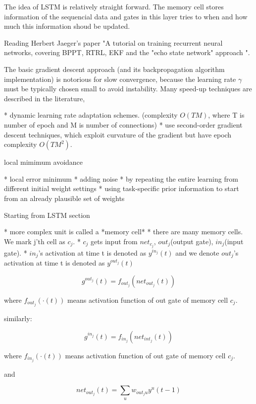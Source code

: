 \documentclass[officiallayout]{tktla}
\begin{document}
The idea of LSTM is relatively straight forward. The memory cell stores information of the sequencial data and gates in this layer tries to when and how much this information shoud be updated.

Reading Herbert Jaeger's paper "A tutorial on training recurrent neural networks, covering BPPT, RTRL, EKF and the "echo state network" approach ".

The basic gradient descent approach (and its backpropagation algorithm implementation) is notorious for slow convergence, because the learning rate $\gamma$ must be typically chosen small to avoid instability. Many speed-up techniques are described in the literature, 

* dynamic learning rate adaptation schemes. (complexity $O(TM)$, where T is number of epoch and M is number of connections)
* use second-order gradient descent techniques, which exploit curvature of the gradient but have epoch complexity $O(TM^2)$. 

local mimimum avoidance

* local error minimum
* adding noise
* by repeating the entire learning from different initial weight settings
* using task-specific prior information to start from an already plausible set of weights

Starting from LSTM section

* more complex unit is called a *memory cell*
* there are many memory cells. We mark j'th cell as $c_j$.
* $c_j$ gets input from $net_{c_j}$, $out_j$(output gate), $in_j$(input gate).
* $in_j$'s activation at time t is denoted as $y^{in_j}(t)$ and we denote $out_j$'s activation at time t is denoted as $y^{out_j}(t)$

\begin{equation}
g^{out_j}(t) = f_{out_j}(net_{out_j}(t))
\end{equation}


where $f_{out_j}(\cdot (t))$ means activation function of out gate of memory cell $c_j$.

similarly:


\begin{equation}
g^{in_j}(t) = f_{in_j}(net_{int_j}(t))
\end{equation}


where $f_{in_j}(\cdot (t))$ means activation function of out gate of memory cell $c_j$.

and


\begin{equation}
net_{out_j}(t) = \sum_u w_{out_ju}y^u(t-1) \label{eq_netout}
\end{equation}
\end{document}
